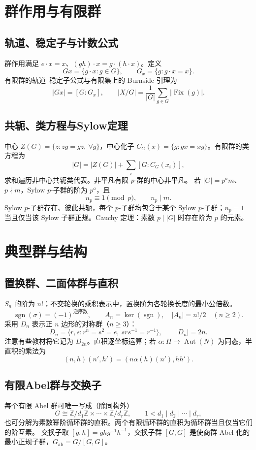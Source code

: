 \documentclass[../main.tex]{subfiles}
\begin{document}
\section{群作用与有限群}
\subsection{轨道、稳定子与计数公式}
群作用满足 $e\cdot x=x$、$(gh)\cdot x=g\cdot(h\cdot x)$。定义
\[
Gx=\{g\cdot x:g\in G\},\qquad G_x=\{g:g\cdot x=x\}.
\]
有限群的轨道--稳定子公式与有限集上的 Burnside 引理为
\[
|Gx|=[G:G_x],\qquad
|X/G|=\frac1{|G|}\sum_{g\in G}|\operatorname{Fix}(g)|.
\]
\subsection{共轭、类方程与Sylow定理}
中心 $Z(G)=\{z:zg=gz,\ \forall g\}$，中心化子 $C_G(x)=\{g:gx=xg\}$。有限群的类方程为
\[
|G|=|Z(G)|+\sum_i[G:C_G(x_i)],
\]
求和遍历非中心共轭类代表。非平凡有限 $p$-群的中心非平凡。
若 $|G|=p^am$、$p\nmid m$，Sylow $p$-子群的阶为 $p^a$，且
\[
n_p\equiv1\pmod p,\qquad n_p\mid m.
\]
Sylow $p$-子群存在、彼此共轭，每个 $p$-子群均包含于某个 Sylow $p$-子群；$n_p=1$ 当且仅当该 Sylow 子群正规。Cauchy 定理：素数 $p\mid|G|$ 时存在阶为 $p$ 的元素。
\section{典型群与结构}
\subsection{置换群、二面体群与直积}
$S_n$ 的阶为 $n!$；不交轮换的乘积表示中，置换阶为各轮换长度的最小公倍数。
\[
\operatorname{sgn}(\sigma)=(-1)^{\text{逆序数}},\qquad
A_n=\ker(\operatorname{sgn}),\quad |A_n|=n!/2\quad(n\ge2).
\]
采用 $D_n$ 表示正 $n$ 边形的对称群（$n\ge3$）：
\[
D_n=\langle r,s:r^n=s^2=e,\ srs^{-1}=r^{-1}\rangle,\qquad |D_n|=2n.
\]
注意有些教材将它记为 $D_{2n}$。直积逐坐标运算；若 $\alpha:H\to\operatorname{Aut}(N)$ 为同态，半直积的乘法为
\[
(n,h)(n',h')=(n\alpha(h)(n'),hh').
\]
\par\begin{samepage}
\subsection{有限Abel群与交换子}
每个有限 Abel 群可唯一写成（除同构外）
\[
G\cong\mathbb Z/d_1\mathbb Z\times\cdots\times\mathbb Z/d_r\mathbb Z,
\qquad 1<d_1\mid d_2\mid\cdots\mid d_r,
\]
也可分解为素数幂阶循环群的直积。两个有限循环群的直积为循环群当且仅当它们的阶互素。
交换子取 $[g,h]=ghg^{-1}h^{-1}$，交换子群 $[G,G]$ 是使商群 Abel 化的最小正规子群，$G_{\mathrm{ab}}=G/[G,G]$。
\par\end{samepage}
\end{document}

